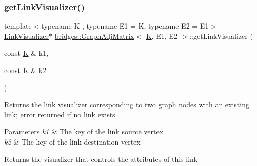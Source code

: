 \subsubsection{\texorpdfstring{getLinkVisualizer()}{getLinkVisualizer()}}
{\footnotesize\ttfamily template$<$typename K , typename E1  = K, typename E2  = E1$>$ \\
\mbox{\hyperlink{classbridges_1_1_link_visualizer}{Link\+Visualizer}}$\ast$ \mbox{\hyperlink{classbridges_1_1_graph_adj_matrix}{bridges\+::\+Graph\+Adj\+Matrix}}$<$ \mbox{\hyperlink{namespacebridges_acfb0a4f7877d8f63de3e6862004c50edaa5f3c6a11b03839d46af9fb43c97c188}{K}}, E1, E2 $>$\+::get\+Link\+Visualizer (\begin{DoxyParamCaption}\item[{const \mbox{\hyperlink{namespacebridges_acfb0a4f7877d8f63de3e6862004c50edaa5f3c6a11b03839d46af9fb43c97c188}{K}} \&}]{k1,  }\item[{const \mbox{\hyperlink{namespacebridges_acfb0a4f7877d8f63de3e6862004c50edaa5f3c6a11b03839d46af9fb43c97c188}{K}} \&}]{k2 }\end{DoxyParamCaption})\hspace{0.3cm}{\ttfamily [inline]}}

Returns the link visualizer corresponding to two graph nodes with an existing link; error returned if no link exists.


\begin{DoxyParams}{Parameters}
{\em k1} & The key of the link source vertex \\
\hline
{\em k2} & The key of the link destination vertex\\
\hline
\end{DoxyParams}
\begin{DoxyReturn}{Returns}
the visualizer that controls the attributes of this link 
\end{DoxyReturn}
\mbox{\label{classbridges_1_1_graph_adj_matrix_aef5c14842d7b8b83037dc63bfd447259}} 
